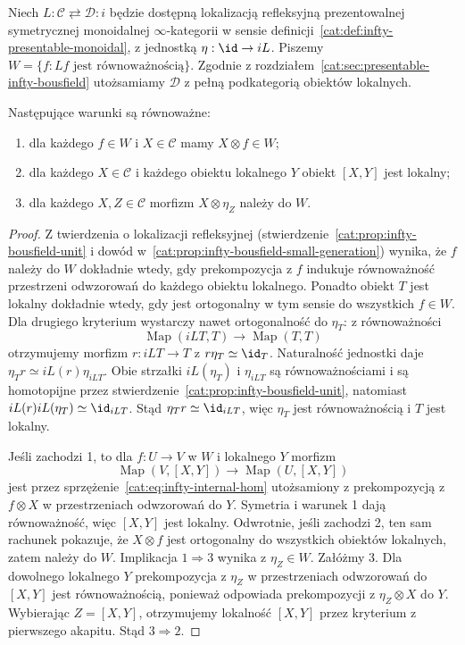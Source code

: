 Niech $L:\mathcal C\rightleftarrows\mathcal D:i$ będzie dostępną lokalizacją refleksyjną prezentowalnej symetrycznej monoidalnej $\infty$-kategorii w sensie definicji~\ref{cat:def:infty-presentable-monoidal}, z jednostką $\eta:\id\to iL$. Piszemy $W=\{f:Lf\text{ jest równoważnością}\}$. Zgodnie z rozdziałem~\ref{cat:sec:presentable-infty-bousfield} utożsamiamy $\mathcal D$ z pełną podkategorią obiektów lokalnych.

\begin{stwierdzenie}\label{cat:prop:infty-monoidal-localization-criterion}
Następujące warunki są równoważne:
\begin{enumerate}
 \item dla każdego $f\in W$ i $X\in\mathcal C$ mamy $X\otimes f\in W$;
 \item dla każdego $X\in\mathcal C$ i każdego obiektu lokalnego $Y$ obiekt $[X,Y]$ jest lokalny;
 \item dla każdego $X,Z\in\mathcal C$ morfizm $X\otimes\eta_Z$ należy do $W$.
\end{enumerate}
\end{stwierdzenie}
\begin{proof}
Z twierdzenia o lokalizacji refleksyjnej (stwierdzenie~\ref{cat:prop:infty-bousfield-unit} i dowód w~\ref{cat:prop:infty-bousfield-small-generation}) wynika, że $f$ należy do $W$ dokładnie wtedy, gdy prekompozycja z $f$ indukuje równoważność przestrzeni odwzorowań do każdego obiektu lokalnego. Ponadto obiekt $T$ jest lokalny dokładnie wtedy, gdy jest ortogonalny w tym sensie do wszystkich $f\in W$. Dla drugiego kryterium wystarczy nawet ortogonalność do $\eta_T$: z równoważności
\[
 \operatorname{Map}(iLT,T)\longrightarrow\operatorname{Map}(T,T)
\]
otrzymujemy morfizm $r:iLT\to T$ z $r\eta_T\simeq\id_T$. Naturalność jednostki daje $\eta_T r\simeq iL(r)\eta_{iLT}$. Obie strzałki $iL(\eta_T)$ i $\eta_{iLT}$ są równoważnościami i są homotopijne przez stwierdzenie~\ref{cat:prop:infty-bousfield-unit}, natomiast $iL(r)iL(\eta_T)\simeq\id_{iLT}$. Stąd $\eta_T r\simeq\id_{iLT}$, więc $\eta_T$ jest równoważnością i $T$ jest lokalny.

Jeśli zachodzi 1, to dla $f:U\to V$ w $W$ i lokalnego $Y$ morfizm
\[
 \operatorname{Map}(V,[X,Y])
 \longrightarrow\operatorname{Map}(U,[X,Y])
\]
jest przez sprzężenie~\eqref{cat:eq:infty-internal-hom} utożsamiony z prekompozycją z $f\otimes X$ w przestrzeniach odwzorowań do $Y$. Symetria i warunek 1 dają równoważność, więc $[X,Y]$ jest lokalny. Odwrotnie, jeśli zachodzi 2, ten sam rachunek pokazuje, że $X\otimes f$ jest ortogonalny do wszystkich obiektów lokalnych, zatem należy do $W$. Implikacja $1\Rightarrow3$ wynika z $\eta_Z\in W$. Załóżmy 3. Dla dowolnego lokalnego $Y$ prekompozycja z $\eta_Z$ w przestrzeniach odwzorowań do $[X,Y]$ jest równoważnością, ponieważ odpowiada prekompozycji z $\eta_Z\otimes X$ do $Y$. Wybierając $Z=[X,Y]$, otrzymujemy lokalność $[X,Y]$ przez kryterium z pierwszego akapitu. Stąd $3\Rightarrow2$.
\end{proof}

